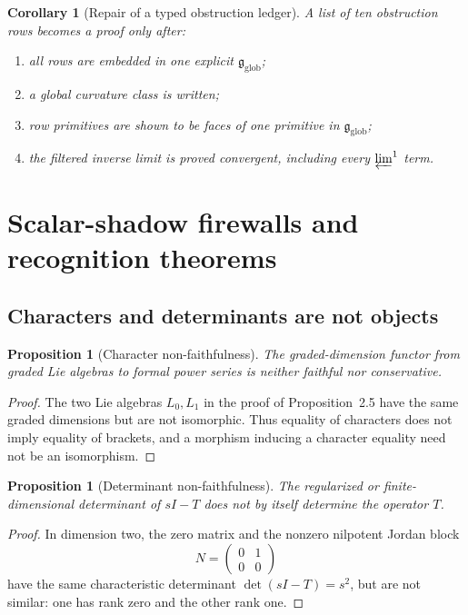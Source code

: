 \documentclass[11pt]{article}
\newtheorem{proposition}[theorem]{Proposition}
\newtheorem{corollary}[theorem]{Corollary}
\theoremstyle{definition}
\theoremstyle{remark}
\newcommand{\1}{\mathbf 1}
\newcommand{\cG}{\mathfrak g}
\begin{document}
\begin{corollary}[Repair of a typed obstruction ledger]
A list of ten obstruction rows becomes a proof only after:
\begin{enumerate}[label=(\roman*)]
\item all rows are embedded in one explicit $\cG_{\mathrm{glob}}$;
\item a global curvature class is written;
\item row primitives are shown to be faces of one primitive in $\cG_{\mathrm{glob}}$;
\item the filtered inverse limit is proved convergent, including every $\varprojlim^1$ term.
\end{enumerate}
\end{corollary}

\section{Scalar-shadow firewalls and recognition theorems}

\subsection{Characters and determinants are not objects}

\begin{proposition}[Character non-faithfulness]
The graded-dimension functor from graded Lie algebras to formal power series is neither faithful nor conservative.
\end{proposition}

\begin{proof}
The two Lie algebras $L_0,L_1$ in the proof of Proposition~2.5 have the same graded dimensions but are not isomorphic.  Thus equality of characters does not imply equality of brackets, and a morphism inducing a character equality need not be an isomorphism.
\end{proof}

\begin{proposition}[Determinant non-faithfulness]
The regularized or finite-dimensional determinant of $sI-T$ does not by itself determine the operator $T$.
\end{proposition}

\begin{proof}
In dimension two, the zero matrix and the nonzero nilpotent Jordan block
\[
N=\begin{pmatrix}0&1\\0&0\end{pmatrix}
\]
have the same characteristic determinant $\det(sI-T)=s^2$, but are not similar: one has rank zero and the other rank one.
\end{proof}
\end{document}
